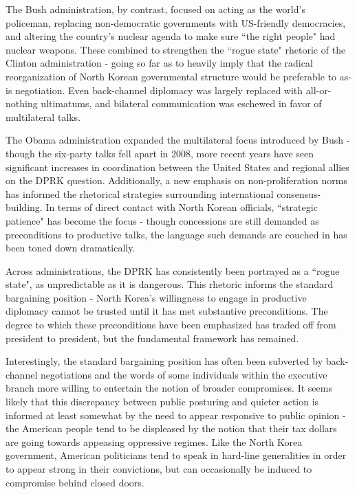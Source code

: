 \documentclass{article}
\begin{document}
The Bush administration, by contrast, focused on acting as the world's policeman, replacing non-democratic governments with US-friendly democracies, and altering the country's nuclear agenda to make sure ``the right people" had nuclear weapons. These combined to strengthen the ``rogue state" rhetoric of the Clinton administration - going so far as to heavily imply that the radical reorganization of North Korean governmental structure would be preferable to as-is negotiation. Even back-channel diplomacy was largely replaced with all-or-nothing ultimatums, and bilateral communication was eschewed in favor of multilateral talks.

The Obama administration expanded the multilateral focus introduced by Bush - though the six-party talks fell apart in 2008, more recent years have seen significant increases in coordination between the United States and regional allies on the DPRK question. Additionally, a new emphasis on non-proliferation norms has informed the rhetorical strategies surrounding international consensus-building. In terms of direct contact with North Korean officials, ``strategic patience" has become the focus - though concessions are still demanded as preconditions to productive talks, the language such demands are couched in has been toned down dramatically.

Across administrations, the DPRK has consistently been portrayed as a ``rogue state", as unpredictable as it is dangerous. This rhetoric informs the standard bargaining position - North Korea's willingness to engage in productive diplomacy cannot be trusted until it has met substantive preconditions. The degree to which these preconditions have been emphasized has traded off from president to president, but the fundamental framework has remained. 

Interestingly, the standard bargaining position has often been subverted by back-channel negotiations and the words of some individuals within the executive branch more willing to entertain the notion of broader compromises. It seems likely that this discrepancy between public posturing and quieter action is informed at least somewhat by the need to appear responsive to public opinion - the American people tend to be displeased by the notion that their tax dollars are going towards appeasing oppressive regimes. Like the North Korea government, American politicians tend to speak in hard-line generalities in order to appear strong in their convictions, but can occasionally be induced to compromise behind closed doors.
\end{document}
